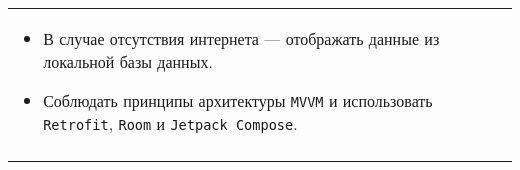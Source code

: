 \documentclass[a4paper]{article}
\begin{document}
\begin{tabular}{!{\vrule width 2pt}p{5cm}|p{6cm}|p{4cm}!{\vrule width 2pt}}
{\begin{minipage}{16cm}
\begin{enumerate}
\begin{itemize}
  \item В случае отсутствия интернета — отображать данные из локальной базы данных.
  \item Соблюдать принципы архитектуры \texttt{MVVM} и использовать \texttt{Retrofit}, \texttt{Room} и \texttt{Jetpack Compose}.
\end{itemize} 
\end{enumerate}

\vspace{0.2cm}
    
\end{minipage}
}
\\
\end{tabular}

\newpage
\end{document}
